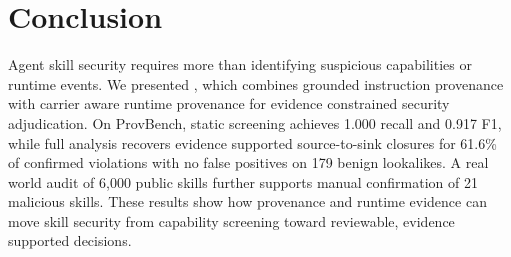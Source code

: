 \section{Conclusion}
\label{sec:conclusion}

Agent skill security requires more than identifying suspicious capabilities or
runtime events. We presented \system, which combines grounded instruction
provenance with carrier aware runtime provenance for evidence constrained
security adjudication. On ProvBench, static screening achieves 1.000 recall and
0.917 F1, while full analysis recovers evidence supported source-to-sink
closures for 61.6\% of confirmed violations with no false positives on 179
benign lookalikes. A real world audit of 6,000 public skills further supports
manual confirmation of 21 malicious skills. These results show how provenance
and runtime evidence can move skill security from capability screening toward
reviewable, evidence supported decisions.